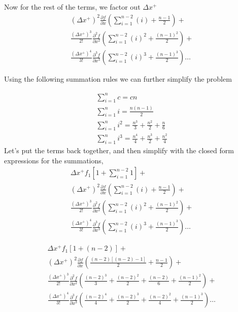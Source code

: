 Now for the rest of the terms, we factor out $\Delta x^+$
\begin{align*}
    (\Delta x^+)^2 \frac{\partial f}{\partial x } \left(
        \sum_{i = 1}^{n - 2} \left( i\right) + \frac{n-1}{2} \right) + \\
        \frac{(\Delta x^+)^3}{2!} \frac{\partial^2 f}{\partial x^2 } \left(
    \sum_{i = 1}^{n - 2} \left( i\right)^2 + \frac{(n-1)^2}{2} \right)  + \\
    \frac{(\Delta x^+)^4}{3!} \frac{\partial^3 f}{\partial x^3 } \left(
    \sum_{i = 1}^{n - 2} \left( i\right)^3 + \frac{(n-1)^3}{2} \right) \dots
\end{align*}

Using the following summation rules we can further simplify the problem


\begin{align*}
    \sum_{i = 1}^{n}c= cn  \\
    \sum_{i = 1}^{n}i =  \frac{n\left( n-1\right)}{2}  \\
    \sum_{i = 1}^{n}i^2  = \frac{n^3}{3} + \frac{n^2}{2} + \frac{n}{6}   \\
    \sum_{i = 1}^{n}i^3  = \frac{n^4}{4} + \frac{n^3}{2} + \frac{n^2}{4}  
\end{align*}
Let's put the terms back together, and then simplify with the closed form 
expressions for the summations,
\begin{align*}
    \Delta x^+ f_1\left[ 1 + \sum_{i=1}^{n-2}1 \right] + \\
    (\Delta x^+)^2 \frac{\partial f}{\partial x } \left(
        \sum_{i = 1}^{n - 2} \left( i\right) + \frac{n-1}{2} \right) + \\
        \frac{(\Delta x^+)^3}{2!} \frac{\partial^2 f}{\partial x^2 } \left(
    \sum_{i = 1}^{n - 2} \left( i\right)^2 + \frac{(n-1)^2}{2} \right)  + \\
    \frac{(\Delta x^+)^4}{3!} \frac{\partial^3 f}{\partial x^3 } \left(
    \sum_{i = 1}^{n - 2} \left( i\right)^3 + \frac{(n-1)^3}{2} \right) \dots
\end{align*}

\begin{align*}
    \Delta x^+ f_1\left[ 1 + (n - 2)  \right] + \\
    (\Delta x^+)^2 \frac{\partial f}{\partial x } \left(
    \frac{(n-2)[\left( n-2 \right)-1]}{2} + \frac{n-1}{2} \right) + \\
        \frac{(\Delta x^+)^3}{2!} \frac{\partial^2 f}{\partial x^2 } \left(
        \frac{(n-2)^3}{3} + \frac{(n-2)^2}{2} + \frac{(n-2)}{6} + \frac{(n-1)^2}{2} \right)  + \\
    \frac{(\Delta x^+)^4}{3!} \frac{\partial^3 f}{\partial x^3 } \left(
    \frac{(n-2)^4}{4} + \frac{(n-2)^3}{2} + \frac{(n-2)^2}{4} + \frac{(n-1)^3}{2} \right) \dots
\end{align*}


